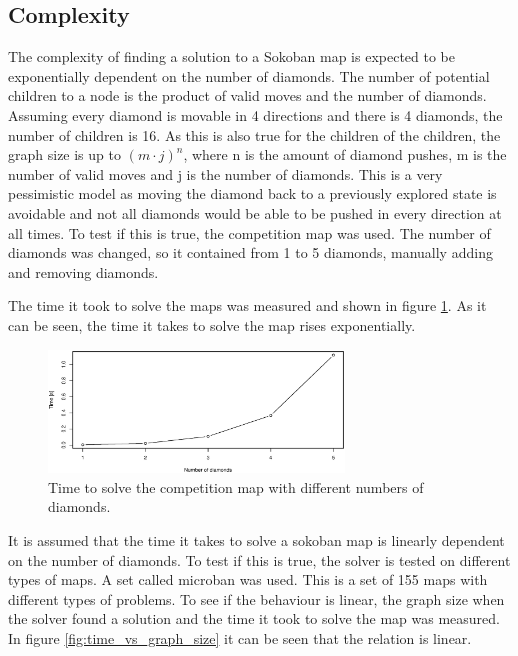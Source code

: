 \subsection{Complexity}
The complexity of finding a solution to a Sokoban map is expected to be exponentially dependent on the number of diamonds.
The number of potential children to a node is the product of valid moves and the number of diamonds.
Assuming every diamond is movable in 4 directions and there is 4 diamonds, the number of children is 16.
As this is also true for the children of the children, the graph size is up to $(m\cdot j)^n$, where n is the amount of diamond pushes, m is the number of valid moves and j is the number of diamonds.
This is a very pessimistic model as moving the diamond back to a previously explored state is avoidable and not all diamonds would be able to be pushed in every direction at all times.
To test if this is true, the competition map was used.
The number of diamonds was changed, so it contained from 1 to 5 diamonds, manually adding and removing diamonds.

The time it took to solve the maps was measured and shown in figure \ref{fig:complexity_of_sokoban}.
As it can be seen, the time it takes to solve the map rises exponentially.

\begin{figure}[h]
\centering
 \includegraphics[width=0.7\textwidth]{img/sokoban_complexity_time}
 \caption{Time to solve the competition map with different numbers of diamonds.}
 \label{fig:complexity_of_sokoban}
\end{figure}


It is assumed that the time it takes to solve a sokoban map is linearly dependent on the number of diamonds.
To test if this is true, the solver is tested on different types of maps.
A set called microban \cite{url:microban} was used.
This is a set of 155 maps with different types of problems.
To see if the behaviour is linear, the graph size when the solver found a solution and the time it took to solve the map was measured.
In figure \ref{fig:time_vs_graph_size} it can be seen that the relation is linear.

